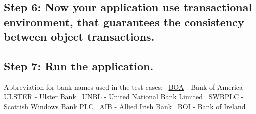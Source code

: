 \hypertarget{index_step6}{}\subsection{Step 6\+: Now your application use transactional environment, that guarantees the consistency between object transactions.}\label{index_step6}
\hypertarget{index_step7}{}\subsection{Step 7\+: Run the application.}\label{index_step7}
Abbreviation for bank names used in the test cases\+:~\newline
 \hyperlink{class_b_o_a}{B\+OA} -\/ Bank of America~\newline
 \hyperlink{class_u_l_s_t_e_r}{U\+L\+S\+T\+ER} -\/ Ulster Bank~\newline
 \hyperlink{class_u_n_b_l}{U\+N\+BL} -\/ United National Bank Limited~\newline
 \hyperlink{class_s_w_b_p_l_c}{S\+W\+B\+P\+LC} -\/ Scottish Windows Bank P\+LC~\newline
 \hyperlink{class_a_i_b}{A\+IB} -\/ Allied Irish Bank~\newline
 \hyperlink{class_b_o_i}{B\+OI} -\/ Bank of Ireland~\newline
 